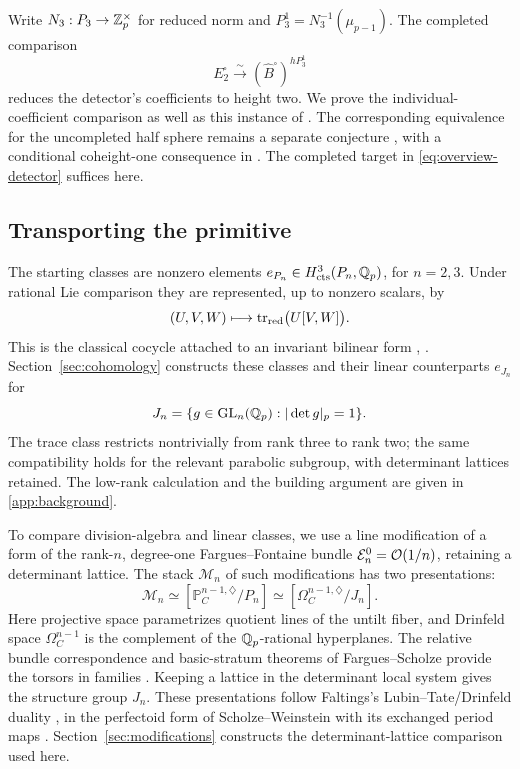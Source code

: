 Write \(N_3:P_3\to\mathbb Z_p^\times\) for reduced norm and
\(P_3^1=N_3^{-1}(\mu_{p-1})\). The completed comparison
\[
 E_2^\square\xrightarrow{\sim}(\widehat B^\square)^{hP_3^1}
\]
reduces the detector's coefficients to height two. We prove the
individual-coefficient comparison as well as this instance of
\cite[Theorem~5.2.6]{BMR2026}. The corresponding equivalence for the
uncompleted half sphere remains a separate conjecture
\cite[Conjectures~1.1.1 and~5.1.13]{BMR2026}, with a conditional
coheight-one consequence in \cite[Proposition~5.1.17]{BMR2026}.
The completed target in \eqref{eq:overview-detector} suffices here.

\subsection{Transporting the primitive}

The starting classes are nonzero elements
\(e_{P_n}\in H^3_{\mathrm{cts}}(P_n,\mathbb Q_p)\), for \(n=2,3\).
Under rational Lie comparison they are represented, up to nonzero
scalars, by
\[
 (U,V,W)\longmapsto\operatorname{tr}_{\mathrm{red}}\bigl(U[V,W]\bigr).
\]
This is the classical cocycle attached to an invariant bilinear form
\cite[\S21]{ChevalleyEilenberg1948}, \cite[\S11]{Koszul1950}.
Section~\ref{sec:cohomology} constructs these classes and their linear
counterparts \(e_{J_n}\) for
\[
 J_n=\{g\in\operatorname{GL}_n(\mathbb Q_p):|\det g|_p=1\}.
\]
The trace class restricts nontrivially from rank three to rank two;
the same compatibility holds for the relevant parabolic subgroup,
with determinant lattices retained. The low-rank calculation and the building argument are given
in \cref{app:background}.

To compare division-algebra and linear classes, we use a line
modification of a form of the rank-\(n\), degree-one Fargues--Fontaine
bundle \(\mathcal E_n^0=\mathcal O(1/n)\), retaining a determinant lattice.
The stack \(\mathcal M_n\) of such modifications has two presentations:
\[
 \mathcal M_n\simeq[\mathbb P_C^{n-1,\diamondsuit}/P_n]
       \simeq[\Omega_C^{n-1,\diamondsuit}/J_n].
\]
Here projective space parametrizes quotient lines of the untilt fiber,
and Drinfeld space \(\Omega_C^{n-1}\) is the complement of the
\(\mathbb Q_p\)-rational hyperplanes. The relative bundle correspondence and
basic-stratum theorems of Fargues--Scholze provide the torsors in
families \cite[Theorem~II.2.19, Corollary~II.2.20, and
Theorems~III.2.4 and~III.4.5]{FS}. Keeping a lattice in the determinant
local system gives the structure group \(J_n\). These presentations
follow Faltings's Lubin--Tate/Drinfeld duality
\cite[Introduction]{Faltings2002}, in the perfectoid form of
Scholze--Weinstein with its exchanged period maps
\cite[Theorem~7.2.3]{SW2013}. Section~\ref{sec:modifications}
constructs the determinant-lattice comparison used here.

